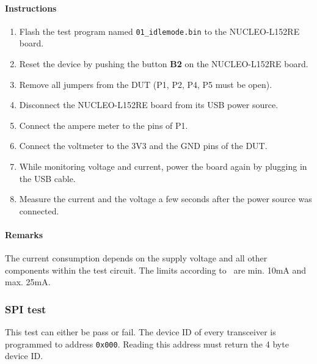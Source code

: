\documentclass[journal,comsoc]{IEEEtran}
\begin{document}
\paragraph{Instructions}
\begin{enumerate}
	\item Flash the test program named \texttt{01\_idlemode.bin} to the NUCLEO-L152RE board.
	\item Reset the device by pushing the button \textbf{B2} on the NUCLEO-L152RE board.
	\item Remove all jumpers from the DUT (P1, P2, P4, P5 must be open).
	\item Disconnect the NUCLEO-L152RE board from its USB power source.
	\item Connect the ampere meter to the pins of P1.
	\item Connect the voltmeter to the 3V3 and the GND pins of the DUT.
	\item While monitoring voltage and current, power the board again by plugging in the USB cable.
	\item Measure the current and the voltage a few seconds after the power source was connected.
\end{enumerate}
\paragraph{Remarks} %
The current consumption depends on the supply voltage and all other components within the test circuit. The limits according to~\cite[section 3.2]{prodtest} are min. 10mA and max. 25mA.\\

\vspace*{1em}
\subsubsection{SPI test}
This test can either be pass or fail. 
The device ID of every transceiver is programmed to address \texttt{0x000}. 
Reading this address must return the 4 byte device ID.
\end{document}
